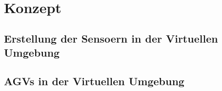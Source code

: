 \chapter{Konzept}
\section{Erstellung der Sensoern in der Virtuellen Umgebung}
\section{AGVs in der Virtuellen Umgebung}
